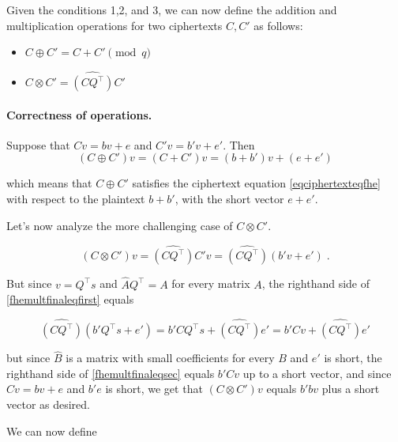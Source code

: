 Given the conditions 1,2, and 3, we can now define the addition and
multiplication operations for two ciphertexts \(C,C'\) as follows:

\begin{itemize}
\item
  \(C \oplus C' = C + C' \pmod{q}\)
\item
  \(C \otimes C' = \widehat{(\ensuremath{\mathit{CQ}}^\top)}C'\)
\end{itemize}


\paragraph{Correctness of operations.} Suppose that \(Cv = bv + e\) and
\(C'v = b'v + e'\). Then
\[(C\oplus C')v = (C+C')v = (b+b')v + (e+e') \label{eqfheaddfinal}\]

which means that \(C \oplus C'\) satisfies the ciphertext equation
\eqref{eqciphertexteqfhe} with respect to the plaintext \(b+b'\), with
the short vector \(e+e'\).

Let's now analyze the more challenging case of \(C \otimes C'\).

\[(C\otimes C')v = \widehat{(\ensuremath{\mathit{CQ}}^\top)}C'v = \widehat{(\ensuremath{\mathit{CQ}}^\top)}(b'v+e') \;. \label{fhemultfinaleqfirst}\]

But since \(v=Q^\top s\) and \(\hat{A}Q^\top = A\) for every matrix
\(A\), the righthand side of \eqref{fhemultfinaleqfirst} equals

\[\widehat{(\ensuremath{\mathit{CQ}}^\top)}(b'Q^\top s+e')=b'C Q^\top s+\widehat{(\ensuremath{\mathit{CQ}}^\top)}e' = b'Cv + \widehat{(\ensuremath{\mathit{CQ}}^\top)}e' \label{fhemultfinaleqsec}\]

but since \(\widehat{B}\) is a matrix with small coefficients for every
\(B\) and \(e'\) is short, the righthand side of
\eqref{fhemultfinaleqsec} equals \(b'Cv\) up to a short vector, and
since \(Cv=bv+e\) and \(b'e\) is short, we get that \((C\otimes C')v\)
equals \(b'bv\) plus a short vector as desired.

We can now define

